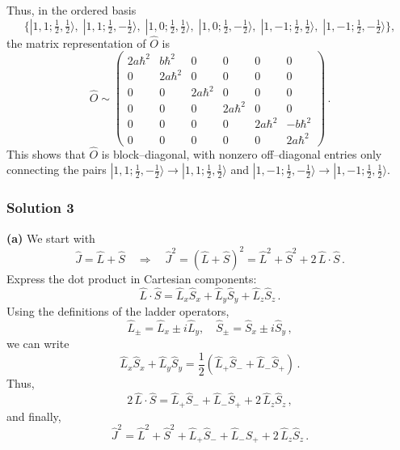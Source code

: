 \documentclass{article}
\begin{document}
Thus, in the ordered basis
\[
\{|1,1;\tfrac{1}{2},\tfrac{1}{2}\rangle,\; |1,1;\tfrac{1}{2},-\tfrac{1}{2}\rangle,\; |1,0;\tfrac{1}{2},\tfrac{1}{2}\rangle,\; |1,0;\tfrac{1}{2},-\tfrac{1}{2}\rangle,\; |1,-1;\tfrac{1}{2},\tfrac{1}{2}\rangle,\; |1,-1;\tfrac{1}{2},-\tfrac{1}{2}\rangle\},
\]
the matrix representation of \(\hat{O}\) is
\[
\hat{O} \sim
\begin{pmatrix}
2a\hbar^2 & b\hbar^2 & 0 & 0 & 0 & 0 \\[1mm]
0 & 2a\hbar^2 & 0 & 0 & 0 & 0 \\[1mm]
0 & 0 & 2a\hbar^2 & 0 & 0 & 0 \\[1mm]
0 & 0 & 0 & 2a\hbar^2 & 0 & 0 \\[1mm]
0 & 0 & 0 & 0 & 2a\hbar^2 & -b\hbar^2 \\[1mm]
0 & 0 & 0 & 0 & 0 & 2a\hbar^2
\end{pmatrix}\,.
\]
This shows that \(\hat{O}\) is block–diagonal, with nonzero off–diagonal entries only connecting the pairs \(|1,1;\tfrac{1}{2},-\tfrac{1}{2}\rangle \to |1,1;\tfrac{1}{2},\tfrac{1}{2}\rangle\) and \(|1,-1;\tfrac{1}{2},-\tfrac{1}{2}\rangle \to |1,-1;\tfrac{1}{2},\tfrac{1}{2}\rangle\).


\subsubsection{Solution 3}
\textbf{(a)} We start with
\[
\hat{J} = \hat{L} + \hat{S} \quad \Rightarrow \quad \hat{J}^2 = (\hat{L} + \hat{S})^2 = \hat{L}^2 + \hat{S}^2 + 2\,\hat{L}\cdot\hat{S}\,.
\]
Express the dot product in Cartesian components:
\[
\hat{L}\cdot\hat{S} = \hat{L}_x\hat{S}_x + \hat{L}_y\hat{S}_y + \hat{L}_z\hat{S}_z\,.
\]
Using the definitions of the ladder operators,
\[
\hat{L}_\pm = \hat{L}_x \pm i \hat{L}_y,\quad \hat{S}_\pm = \hat{S}_x \pm i \hat{S}_y\,,
\]
we can write
\[
\hat{L}_x\hat{S}_x + \hat{L}_y\hat{S}_y = \frac{1}{2}\left( \hat{L}_+\hat{S}_- + \hat{L}_-\hat{S}_+ \right)\,.
\]
Thus,
\[
2\,\hat{L}\cdot\hat{S} = \hat{L}_+\hat{S}_- + \hat{L}_-\hat{S}_+ + 2\,\hat{L}_z\hat{S}_z\,,
\]
and finally,
\[
\boxed{\hat{J}^2 = \hat{L}^2 + \hat{S}^2 + \hat{L}_+\hat{S}_- + \hat{L}_-\hat{S}_+ + 2\,\hat{L}_z\hat{S}_z}\,.
\]
\end{document}
